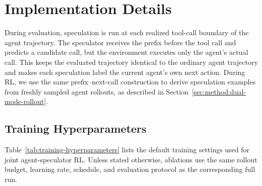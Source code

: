 \appendix

\section{Implementation Details}
\label{sec:appendix:implementation-details}

During evaluation, speculation is run at each realized tool-call boundary of the
agent trajectory. The speculator receives the prefix before the tool call and
predicts a candidate call, but the environment executes only the agent's actual
call. This keeps the evaluated trajectory identical to the ordinary agent
trajectory and makes each speculation label the current agent's own next action.
During RL, we use the same prefix--next-call construction to derive speculation
examples from freshly sampled agent rollouts, as described in
Section~\ref{sec:method:dual-mode-rollout}.

\subsection{Training Hyperparameters}
\label{sec:appendix:training-hyperparameters}

Table~\ref{tab:training-hyperparameters} lists the default training settings
used for joint agent-speculator RL. Unless stated otherwise, ablations use the
same rollout budget, learning rate, schedule, and evaluation protocol as the
corresponding full run.

\begin{table}[h]
\centering
\setlength{\tabcolsep}{4pt}
\caption{Default training hyperparameters.}
\label{tab:training-hyperparameters}
\end{table}


